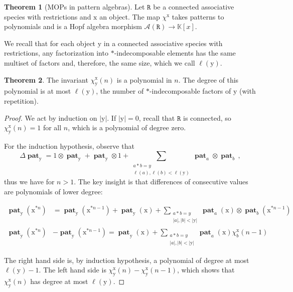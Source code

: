 \documentclass[12pt, reqno]{amsart}
\theoremstyle{definition}
\newtheorem{thm}{Theorem}[section]
\DeclareMathOperator{\pat}{\mathbf{pat}}
\newcommand{\xx}{\mathrm{x}}
\newcommand{\yy}{\mathrm{y}}
\begin{document}
\begin{thm}[MOPs in pattern algebras]\label{thm:polynomiality}
Let $\mathtt{R}$ be a connected associative species with restrictions and $\mathrm{x}$ an object.
The map $\chi^{\mathrm{x}}$ takes patterns to polynomials and is a Hopf algebra morphism $\mathcal A(\mathtt{R}) \to \mathbb{K}[x]$.
\end{thm}

We recall that for each object $\yy$ in a connected associative species with restrictions, any factorization into $\ast$-indecomposable elements has the same multiset of factors and, therefore, the same size, which we call $\ell(\yy)$.

\begin{thm}\label{lm:polynomial}
The invariant $\chi^{\xx}_{\yy}(n)$ is a polynomial in $n$.
The degree of this polynomial is at most $\ell(\yy)$, the number of $\ast$-indecomposable factors of $\yy$ (with repetition).
\end{thm}


\begin{proof}
We act by induction on $|\yy|$.
If $|\yy| = 0$, recall that $\mathtt{R}$ is connected, so $\chi^{\xx}_{\yy}(n) = 1$ for all $n$, which is a polynomial of degree zero.

For the induction hypothesis, observe that
$$\Delta \pat_{\yy} = 1\otimes \pat_{\yy} + \pat_{\yy} \otimes 1 + \sum_{\substack{a \ast b = y\\\ell(a), \ell(b) < \ell(\yy)}} \pat_a \otimes \pat_b \, ,$$
thus we have for $n > 1$. The key insight is that differences of consecutive values are polynomials of lower degree:

\begin{equation*}
    \begin{split}
        \pat_{\yy}(\xx^{\ast n}) &= \pat_{\yy}(\xx^{\ast n-1}) + \pat_{\yy}(\xx) + \sum_{\substack{a \ast b = y\\|a|, |b| < |\yy|}} \pat_a (\xx) \otimes \pat_b (\xx^{\ast n-1}) \\
         \pat_{\yy}(\xx^{\ast n}) &- \pat_{\yy}(\xx^{\ast n-1}) = \pat_{\yy}(\xx) + \sum_{\substack{a \ast b = y\\|a|, |b| < |\yy|}} \pat_a (\xx) \chi^{\xx}_b ( n-1)
    \end{split}
\end{equation*}

The right hand side is, by induction hypothesis, a polynomial of degree at most $\ell(\yy) -1$.
The left hand side is $\chi^{\xx}_{\yy}(n) - \chi^{\xx}_{\yy}(n-1)$, which shows that $\chi^{\xx}_{\yy}(n)$ has degree at most $\ell(\yy)$.
\end{proof}
\end{document}
